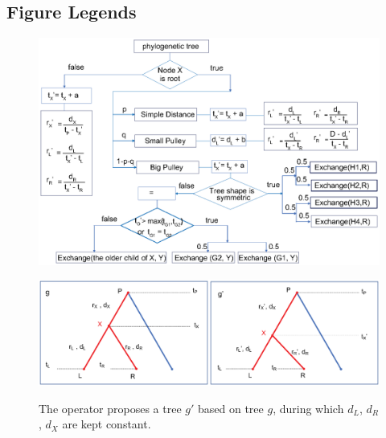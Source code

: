 \documentclass{bmcart}
\begin{document}
\begin{backmatter}



\section*{Figure Legends}
\begin{figure}[h!]
\includegraphics[width=12cm]{Fig01-flowchart.eps}\\
\caption{}
\label{flowchart}
\end{figure}

\begin{figure}[h!]
\includegraphics[width=12cm]{Fig02-internalnodes.eps}\\
\caption{
             The operator proposes a tree ${g}'$ based on tree $g$, during which $d_L$, $d_R$, $d_X$ are kept constant.}
\label{internalnodes}
\end{figure}


\end{backmatter}
\end{document}
